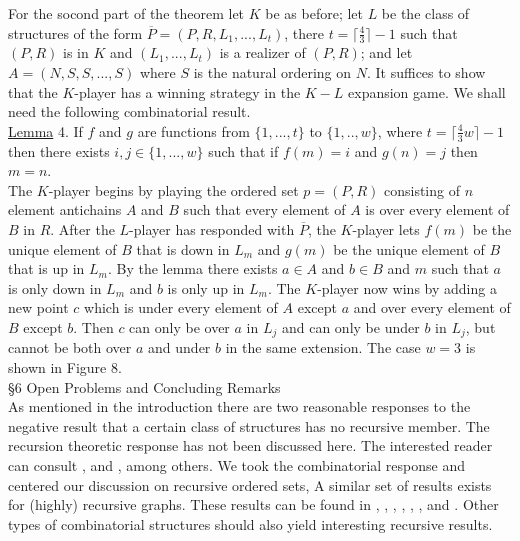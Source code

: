 \documentclass[twoside]{article}
\begin{document}
For the socond part of the theorem let $K$ be as before; let $L$ be the class of structures
of the form $\overline{P}=(P,R,L_1,...,L_t)$, there $t=\lceil \frac 4 3\rceil - 1$ such that
$(P,R)$ is in $K$ and $(L_1,...,L_t)$ is a realizer of $(P,R)$; and let $A=(N,S,S,...,S)$
where $S$ is the natural ordering on $N$. It suffices to show that the $K$-player has a winning
strategy in the $K-L$ expansion game. We shall need the following combinatorial result.\\
\newline
\underline{Lemma} 4. \cite{TrotterMonroe82} If $f$ and $g$ are functions from $\{1,...,t\}$
to $\{1,..,w\}$, where $t = \lceil {\frac 4 3}w \rceil - 1$ then there exists $i,j \in \{1,...,w\}$
such that if $f(m) = i$ and $g(n) = j$ then $m=n$.\\

The $K$-player begins by playing the ordered set $p=(P,R)$ consisting of $n$ element antichains
$A$ and $B$ such that every element of $A$ is over every element of $B$ in $R$. After the $L$-player
has responded with $\overline{P}$, the $K$-player lets $f(m)$ be the unique element of $B$
that is down in $L_m$ and $g(m)$ be the unique element of $B$ that is up in $L_m$. By the lemma there exists
$a \in A$ and $b \in B$ and $m$ such that $a$ is only down in $L_m$ and $b$ is only up in $L_m$.
The $K$-player now wins by adding a new point $c$ which is under every element of $A$ except
$a$ and over every element of $B$ except $b$. Then $c$ can only be over $a$ in $L_j$ and can only be under
$b$ in $L_j$, but cannot be both over $a$ and under $b$ in the same extension. The case
$w=3$ is shown in Figure 8.\\
%
%


\noindent\S 6 Open Problems and Concluding Remarks\\


As mentioned in the introduction there are two reasonable responses to the negative result that
a certain class of structures has no recursive member. The recursion theoretic response has not
been discussed here. The interested reader can consult \cite{Jackush72}, \cite{JackushSoare72}
and \cite{Rosentein82}, among others. We took the combinatorial response and centered our discussion on recursive
ordered sets, A similar set of results exists for (highly) recursive graphs. These results can be found in \cite{Bean76},
\cite{Kierstead81b}, \cite{Kiersted83}, \cite{ManasterRosentein73}, \cite{Schmerl80}, \cite{Shmerl82}, and \cite{Tverber}.
Other types of combinatorial structures should also yield interesting recursive results.\\
\end{document}
